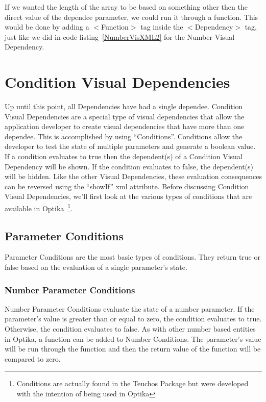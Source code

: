 If we wanted the length of the array to be based on something other then the direct value of the dependee parameter, we could run it through a function. This would 
be done by adding a $<$Function$>$ tag inside the $<$Dependency$>$ tag, just like we did in code listing~\ref{NumberVisXML2} for the Number Visual Dependency.

\section{Condition Visual Dependencies}
Up until this point, all Dependencies have had a single dependee. Condition Visual Dependencies are a special type of visual dependencies that allow the application developer to
create visual dependencies that have more than one dependee. This is accomplished by using ``Conditions''. Conditions allow the developer to test the state of multiple 
parameters and generate a boolean value. If a condition evaluates to true then the dependent(s) of a Condition Visual Dependency will be shown. If the condition evaluates to 
false, the dependent(s) will be hidden. Like the other Visual Dependencies, these evaluation consequences can be reversed using the ``showIf'' xml attribute.  Before discussing 
Condition Visual Dependencies, we'll first look at the various types of conditions that are available in Optika~\footnote{Conditions are actually found in the Teuchos Package 
but were developed with the intention of being used in Optika}.

\subsection{Parameter Conditions}
Parameter Conditions are the most basic types of conditions. They return true or false based on the evaluation of a single parameter's state.

\subsubsection{Number Parameter Conditions}
Number Parameter Conditions evaluate the state of a number parameter. If the parameter's value is greater than or equal to zero, the condition evaluates to true. Otherwise, the 
condition evaluates to false. As with other number based entities in Optika, a function can be added to Number Conditions. The parameter's value will be run through the 
function and then the return value of the function will be compared to zero.

